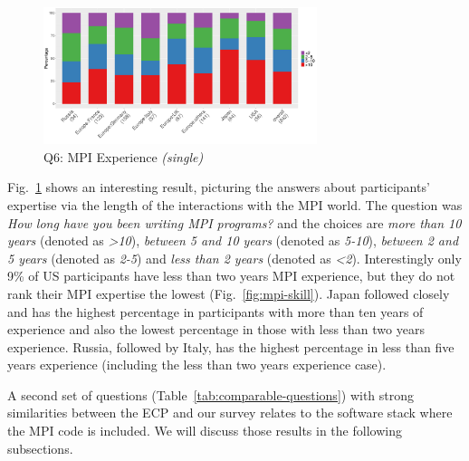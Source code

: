 \documentclass[preprint,5p,times]{elsarticle}
\def\myquote#1{{\it #1}}
\newcommand{\revision}[2]{{\color{blue}#2}}
\begin{document}
\begin{figure}[tb]
  \begin{center}
    \includegraphics[width=8.0cm]{R-scripts/Q6.pdf}
    \vspace{-2mm}
    \caption{Q6: MPI Experience {\it(single)}}
    \label{fig:mpi-experience}
  \end{center}
\end{figure}

Fig.~\ref{fig:mpi-experience} shows an interesting result, picturing the answers
about participants' expertise via the length of the interactions with the MPI
world. The question was {\it How long have you been writing MPI programs?} and
the choices are {\it more than 10 years} (denoted as \myquote{\textgreater 10}),
\myquote{between 5 and 10 years} (denoted as \myquote{5-10}), \myquote{between 2
and 5 years} (denoted as \myquote{2-5}) and \myquote{less than 2 years} (denoted
as \myquote{\textless 2}). Interestingly only 9\% of US participants have less
than \revision{2}{two} years MPI experience, but they do
\revision{no}{not} rank their MPI expertise the lowest 
(Fig.~\ref {fig:mpi-skill}). Japan followed closely \revision{}{and} has the highest percentage
in participants with more than \revision{10}{ten} years of experience
and also the lowest 
percentage in those with less than \revision{2}{two} years experience. Russia, followed by
Italy, has the highest percentage in less than \revision{5}{five} years experience (including the
less than \revision{2}{two} years experience case).

A second set of questions (Table~\ref{tab:comparable-questions}) with strong
similarities between the ECP and our survey relates to the software stack where
the MPI code is included. We will discuss those results in the following
subsections.
\end{document}
